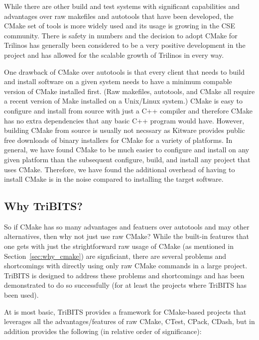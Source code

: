 \documentclass[note]{TechNote}
\begin{document}
While there are other build and test systems with significant capabilities and advantages over raw makefiles and autotools that have been developed, the CMake set of tools is more widely used and its usage is growing in the CSE community.  There is safety in numbers and the decision to adopt CMake for Trilinos has generally been considered to be a very positive development in the project and has allowed for the scalable growth of Trilinos in every way.

One drawback of CMake over autotools is that every client that needs to build and install software on a given system needs to have a minimum compable version of CMake installed first.  (Raw makefiles, autotools, and CMake all require a recent version of Make installed on a Unix/Linux system.)  CMake is easy to configure and install from source with just a C++ compiler and therefore CMake has no extra dependencies that any basic C++ program would have.  However, building CMake from source is usually not necssary as Kitware provides public free downloads of binary installers for CMake for a variety of platforms.  In general, we have found CMake to be much easier to configure and install on any given platform than the subsequent configure, build, and install any project that uses CMake.  Therefore, we have found the additional overhead of having to install CMake is in the noise compared to installing the target software.

%
\subsection{Why TriBITS?}
\label{sec:why_tribits}
%

So if CMake has so many advantages and featuers over autotools and may other alternatives, then why not just use raw CMake?  While the built-in features that one gets with just the strightforward raw usage of CMake (as mentioned in Section~\ref{sec:why_cmake}) are signficiant, there are several problems and shortcomings with directly using only raw CMake commands in a large project.  TriBITS is designed to address these problems and shortcomings and has been demonstrated to do so successfully (for at least the projects where TriBITS has been used).

At is most basic, TriBITS provides a framework for CMake-based projects that leverages all the advantages/features of raw CMake, CTest, CPack, CDash, but in addition provides the following (in relative order of significance):
\end{document}
